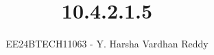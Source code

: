 \documentclass[journal]{IEEEtran}
\begin{document}
	
	
	\vspace{3cm}
	
	\title{10.4.2.1.5}
	\author{EE24BTECH11063 - Y. Harsha Vardhan Reddy}
	{\let\newpage\relax\maketitle}
	
	\renewcommand{\thefigure}{\theenumi}
	\renewcommand{\thetable}{\theenumi}
	\setlength{\intextsep}{10pt} %
	
	
	\renewcommand{\thetable}{\theenumi}
	
\end{document}

